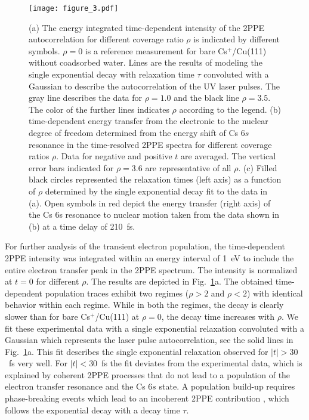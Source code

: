 \documentclass[aps,twocolumn,amssymb,amsfonts,amsmath,showpacs,final,a4paper,superscriptaddress]{revtex4-2}
\begin{document}
\begin{figure}[h!]
    \centering
    \texttt{[image: figure\_3.pdf]}
    \caption{(a) The energy integrated time-dependent intensity of the 2PPE autocorrelation for different coverage ratio $\rho$ is indicated by different symbols. $\rho=0$ is a reference measurement for bare Cs$^+$/Cu(111) without coadsorbed water. Lines are the results of modeling the single exponential decay with relaxation time $\tau$ convoluted with a Gaussian to describe the autocorrelation of the UV laser pulses. The gray line describes the data for $\rho=1.0$ and the black line $\rho=3.5$. The color of the further lines indicates $\rho$ according to the legend. (b) time-dependent energy transfer from the electronic to the nuclear degree of freedom determined from the energy shift of Cs $6s$ resonance in the time-resolved 2PPE spectra for different coverage ratios $\rho$. Data for negative and positive $t$ are averaged. The vertical error bars indicated for $\rho=3.6$ are representative of all $\rho$. (c) Filled black circles represented the relaxation times (left axis) as a function of $\rho$ determined by the single exponential decay fit to the data in (a). Open symbols in red depict the energy transfer (right axis) of the Cs 6s resonance to nuclear motion taken from the data shown in (b) at a time delay of 210~fs.}
    \label{fig:fig 3}
\end{figure}






For further analysis of the transient electron population, the time-dependent 2PPE intensity was integrated within an energy interval of 1~eV to include the entire electron transfer peak in the 2PPE spectrum. The intensity is normalized at $t=0$ for different $\rho$. The results are depicted in Fig.~\ref{fig:fig 3}a. The obtained time-dependent population traces exhibit two regimes ($\rho>2$ and $\rho<2$) with identical behavior within each regime. While in both the regimes, the decay is clearly slower than for bare Cs$^+$/Cu(111) at $\rho=0$, the decay time increases with $\rho$. We fit these experimental data with a single exponential relaxation convoluted with a Gaussian which represents the laser pulse autocorrelation, see the solid lines in Fig.~\ref{fig:fig 3}a. This fit describes the single exponential relaxation observed for $|t|>30$~fs very well. For $|t|<30$~fs the fit deviates from the experimental data, which is explained by coherent 2PPE processes that do not lead to a population of the electron transfer resonance and the Cs $6s$ state. A population build-up requires phase-breaking events which lead to an incoherent 2PPE contribution \cite{petek_ogawa_1997,weinelt_2002}, which follows the exponential decay with a decay time $\tau$.
\end{document}
